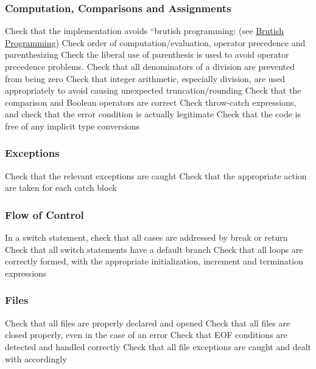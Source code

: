 \subsubsection{Computation, Comparisons and Assignments}
\begin{itemize}
		Check that the implementation avoids “brutish programming: (see \href{http://users.csc.calpoly.edu/~jdalbey/SWE/CodeSmells/bonehead.html}{Brutish Programming})
		Check order of computation/evaluation, operator precedence and parenthesizing
		Check the liberal use of parenthesis is used to avoid operator precedence problems.
		Check that all denominators of a division are prevented from being zero
		Check that integer arithmetic, especially division, are used appropriately to avoid causing unexpected truncation/rounding
		Check that the comparison and Boolean operators are correct
		Check throw-catch expressions, and check that the error condition is actually legitimate
		Check that the code is free of any implicit type conversions
\end{itemize}

\subsubsection{Exceptions}
\begin{itemize}
		Check that the relevant exceptions are caught
		Check that the appropriate action are taken for each catch block
\end{itemize}

\subsubsection{Flow of Control}
\begin{itemize}
		In a switch statement, check that all cases are addressed by break or return
		Check that all switch statements have a default branch
		Check that all loops are correctly formed, with the appropriate initialization, increment and termination expressions
\end{itemize}

\subsubsection{Files}
\begin{itemize}
		Check that all files are properly declared and opened
		Check that all files are closed properly, even in the case of an error
		Check that EOF conditions are detected and handled correctly
		Check that all file exceptions are caught and dealt with accordingly
\end{itemize}

